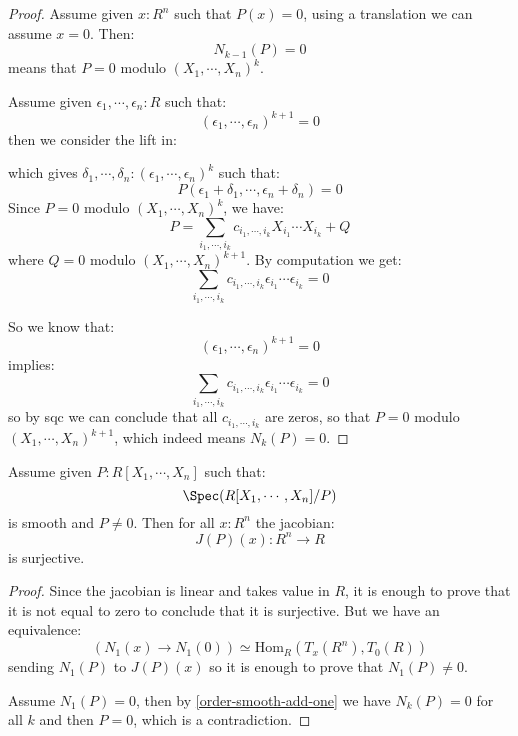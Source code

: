 \begin{proof}
Assume given $x:R^n$ such that $P(x)=0$, using a translation we can assume $x=0$. Then:
\[N_{k-1}(P) = 0\]
means that $P=0$ modulo $(X_1,\cdots,X_n)^k$.

Assume given $\epsilon_1,\cdots,\epsilon_n:R$ such that:
\[(\epsilon_1,\cdots,\epsilon_n)^{k+1}=0\]
then we consider the lift in:
 \begin{center}
    \end{center} 
    which gives $\delta_1,\cdots,\delta_n: (\epsilon_1,\cdots,\epsilon_n)^k$ such that:
    \[P(\epsilon_1+\delta_1,\cdots,\epsilon_n+\delta_n) = 0\]
    Since $P=0$ modulo $(X_1,\cdots,X_n)^k$, we have:
\[P = \sum_{i_1,\cdots,i_k} c_{i_1,\cdots,i_k} X_{i_1}\cdots X_{i_k} + Q\]
where $Q=0$ modulo $(X_1,\cdots,X_n)^{k+1}$. By computation we get:
   \[\sum_{i_1,\cdots,i_k} c_{i_1,\cdots,i_k} \epsilon_{i_1}\cdots \epsilon_{i_k} = 0\]
   
   So we know that:
   \[(\epsilon_1,\cdots,\epsilon_n)^{k+1}=0\]
   implies:
   \[\sum_{i_1,\cdots,i_k} c_{i_1,\cdots,i_k} \epsilon_{i_1}\cdots \epsilon_{i_k} = 0\]
   so by sqc we can conclude that all $c_{i_1,\cdots,i_k}$ are zeros, so that $P = 0$ modulo $(X_1,\cdots,X_n)^{k+1}$, which indeed means $N_k(P)=0$.
\end{proof}

\begin{lemma}
Assume given $P:R[X_1,\cdots,X_n]$ such that:
\[\Spec(R[X_1,\cdots,X_n]/P)\]
is smooth and $P\not=0$. Then for all $x:R^n$ the jacobian:
\[J(P)(x) : R^n \to R\]
is surjective.
\end{lemma}

\begin{proof}
Since the jacobian is linear and takes value in $R$, it is enough to prove that it is not equal to zero to conclude that it is surjective. But we have an equivalence:
\[(N_1(x)\to N_1(0)) \simeq \mathrm{Hom}_R(T_x(R^n),T_0(R))\]
sending $N_1(P)$ to $J(P)(x)$ so it is enough to prove that $N_1(P)\not=0$. 

Assume $N_1(P)=0$, then by \cref{order-smooth-add-one} we have $N_k(P)=0$ for all $k$ and then $P=0$, which is a contradiction.
\end{proof}

